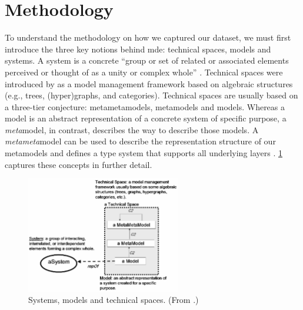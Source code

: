 \section{Methodology}
\label{sec:dataset:architecture:methodology}

To understand the methodology on how we captured our dataset, we must first introduce the three key notions behind \gls{mde}: technical spaces, models and systems. A system is a concrete ``group or set of related or associated elements perceived or thought of as a unity or complex whole'' \citep{oed:system}. Technical spaces were introduced by \citet{Bezivin:2002} as a model management framework based on algebraic structures (e.g., trees, (hyper)graphs, and categories). Technical spaces are usually based on a three-tier conjecture: metametamodels, metamodels and models. Whereas a model is an abstract representation of  a concrete system of specific purpose, a \textit{meta}model, in contrast, describes the way to describe those models. A \textit{metameta}model can be used to describe the representation structure of our metamodels and defines a type system \cite{Cardelli:1985ee} that supports all underlying layers \citep{Bezivin:2006gw}. \cref{fig:dataset:bezivin2006_metamodel} captures these concepts in further detail.

\begin{figure}[h]
  \centering
  \includegraphics[width=0.6\textwidth]{images/dataset/bezivin2006_metamodel}
  \caption[An overview of systems, models and technical spaces]{Systems, models and technical spaces. (From \citep{Bezivin:2006gw}.)}
  \label{fig:dataset:bezivin2006_metamodel}
\end{figure}


